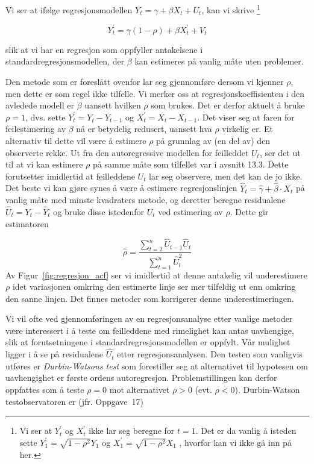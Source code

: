 \noindent Vi ser at ifølge regresjonsmodellen
$Y_t = \gamma + \beta X_t + U_t$, kan vi skrive
 \footnote{Vi ser at $Y_t^{'}$ og $X_t^{'}$ ikke lar seg beregne for
$t = 1$. Det er da vanlig å isteden sette $Y_1^{'} =\sqrt{1-{\rho}^2}Y_1$
og $X_1^{'} =\sqrt{1-{\rho}^2}X_1$ , hvorfor kan vi ikke gå inn på her.}  

\[Y_t^{'} = \gamma(1-\rho) + \beta X_t^{'} + V_t \]

\noindent slik at vi har en regresjon som oppfyller antakelsene i 
standardregresjonsmodellen, der $\beta$ kan estimeres på vanlig måte
uten problemer.

Den metode som er foreslått ovenfor lar seg gjennomføre dersom vi
kjenner $\rho$, men dette er som regel ikke tilfelle.  Vi merker oss at
regre\-sjons\-koef\-fisienten i den avledede modell er $\beta$ uansett
hvilken $\rho$ som brukes.  Det er derfor aktuelt å bruke $\rho = 1$, dvs.
sette $Y_t^{'} = Y_t - Y_{t-1}$ og $X_t^{'} = X_t - X_{t-1}$. Det viser seg at
faren for feilestimering av $\beta$ nå er betydelig redusert, uansett hva
$\rho$ virkelig er.  Et alternativ til dette vil være å estimere $\rho$
på grunnlag av (en del av) den observerte rekke.  Ut fra den 
autoregressive modellen for feilleddet $U_t$, ser det ut til at vi kan 
estimere $\rho$ på samme måte som tilfellet var i avsnitt 13.3.  Dette
forutsetter imidlertid at feilleddene $U_t$ lar seg observere, men det kan
de jo ikke.  Det beste vi kan gjøre synes å være å estimere
regresjonslinjen ${\hat{Y}}_t = \hat{\gamma} + {\hat{\beta}}\cdot X_t$ på
vanlig måte med minste kvadraters metode, og deretter beregne residualene
${\hat{U}}_t = Y_t - {\hat{Y}}_t$ og bruke disse istedenfor $U_t$ ved estimering av
$\rho$.  Dette gir estimatoren

\[ \hat{\rho}=\frac{\sum_{t=2}^n {\hat{U}}_{t-1}{\hat{U}}_t}
                   {\sum_{t=1}^n {\hat{U}}_t^2}  \]
\noindent Av Figur~\ref{fig:regresjon_acf} ser vi imidlertid at denne antakelig vil underestimere
$\rho$ idet variasjonen omkring den estimerte linje ser mer tilfeldig ut enn
omkring den sanne linjen.  Det finnes metoder som korrigerer denne
underestimeringen.

Vi vil ofte ved gjennomføringen av en regresjonsanalyse etter vanlige 
metoder være interessert i å teste om feilleddene med rimelighet kan
antas uavhengige, slik at forutsetningene i standardregresjonsmodellen er
oppfylt.  Vår mulighet ligger i å se på residualene $\hat{U_t}$
etter regresjonsanalysen.  Den testen som vanligvis utføres er
{\em Durbin-Watsons test} som forestiller seg at alternativet til hypotesen
om uavhengighet er første ordens autoregresjon.  Problemstillingen kan
derfor oppfattes som å teste $\rho =0 $ mot alternativet $\rho > 0 $ (evt.
$\rho < 0 $).  Durbin-Watson testobservatoren er (jfr. Oppgave~17)

